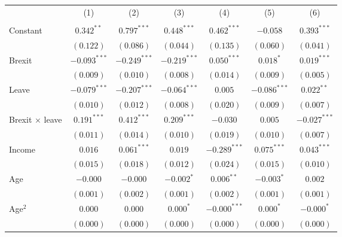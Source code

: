\documentclass[12pt, letter]{article}
\begin{document}
\begin{table}
\begin{center}
{\begin{tabular}{l c c c c c c}
\\[0pt]
 & (1) & (2) & (3) & (4) & (5) & (6) \\[3pt]
\cmidrule[1pt]{2-7}
\\[-12pt] 
Constant                         & $0.342^{**}$   & $0.797^{***}$  & $0.448^{***}$  & $0.462^{***}$  & $-0.058$       & $0.393^{***}$  \\
                                 & $(0.122)$      & $(0.086)$      & $(0.044)$      & $(0.135)$      & $(0.060)$      & $(0.041)$      \\
Brexit                           & $-0.093^{***}$ & $-0.249^{***}$ & $-0.219^{***}$ & $0.050^{***}$  & $0.018^{*}$    & $0.019^{***}$  \\
                                 & $(0.009)$      & $(0.010)$      & $(0.008)$      & $(0.014)$      & $(0.009)$      & $(0.005)$      \\
Leave                            & $-0.079^{***}$ & $-0.207^{***}$ & $-0.064^{***}$ & $0.005$        & $-0.086^{***}$ & $0.022^{**}$   \\
                                 & $(0.010)$      & $(0.012)$      & $(0.008)$      & $(0.020)$      & $(0.009)$      & $(0.007)$      \\
Brexit $\times$ leave                   & $0.191^{***}$  & $0.412^{***}$  & $0.209^{***}$  & $-0.030$       & $0.005$        & $-0.027^{***}$ \\
                                 & $(0.011)$      & $(0.014)$      & $(0.010)$      & $(0.019)$      & $(0.010)$      & $(0.007)$      \\
Income                           & $0.016$        & $0.061^{***}$  & $0.019$        & $-0.289^{***}$ & $0.075^{***}$  & $0.043^{***}$  \\
                                 & $(0.015)$      & $(0.018)$      & $(0.012)$      & $(0.024)$      & $(0.015)$      & $(0.010)$      \\
Age                              & $-0.000$       & $-0.000$       & $-0.002^{*}$   & $0.006^{**}$   & $-0.003^{*}$   & $0.002$        \\
                                 & $(0.001)$      & $(0.002)$      & $(0.001)$      & $(0.002)$      & $(0.001)$      & $(0.001)$      \\
Age$^2$                            & $0.000$        & $0.000$        & $0.000^{*}$    & $-0.000^{***}$ & $0.000^{*}$    & $-0.000^{*}$   \\
                                 & $(0.000)$      & $(0.000)$      & $(0.000)$      & $(0.000)$      & $(0.000)$      & $(0.000)$      \\

\end{tabular}}
\end{center}
\end{table}
\end{document}
